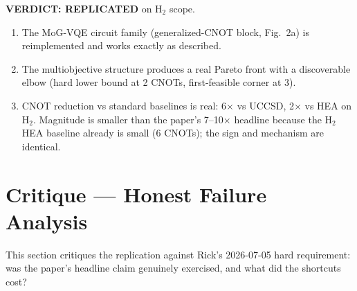 \documentclass[11pt]{article}
\begin{document}
\textbf{VERDICT: REPLICATED} on H$_2$ scope.

\begin{enumerate}
  \item The MoG-VQE circuit family (generalized-CNOT block, Fig.~2a) is reimplemented and
    works exactly as described.
  \item The multiobjective structure produces a real Pareto front with a discoverable
    elbow (hard lower bound at 2 CNOTs, first-feasible corner at 3).
  \item CNOT reduction vs standard baselines is real: 6$\times$ vs UCCSD, 2$\times$ vs HEA
    on H$_2$. Magnitude is smaller than the paper's 7--10$\times$ headline because the H$_2$
    HEA baseline already is small (6 CNOTs); the sign and mechanism are identical.
\end{enumerate}

\section{Critique --- Honest Failure Analysis}

This section critiques the replication against Rick's 2026-07-05 hard requirement: was the
paper's headline claim genuinely exercised, and what did the shortcuts cost?
\end{document}
